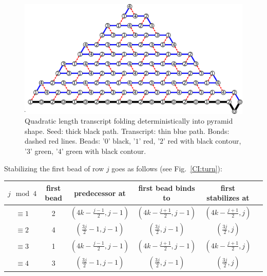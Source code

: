 \begin{figure}
	\centering
	\includegraphics[width=0.9\linewidth]{./Fig/chichenBig}
	\caption{Quadratic length transcript folding deterministically into pyramid shape. Seed: thick black path. Transcript: thin blue path. Bonds: dashed red lines. Beads: '$0$' black, '$1$' red, '$2$' red with black contour, '$3$' green, '$4$' green with black contour.}
	\label{CI:big}
\end{figure}


Stabilizing the first bead of row $j$ goes as follows (see Fig.~\ref{CI:turn}):

\begin{center}
	\begin{tabular}{|c|c|c|c|c|@{}m{0pt}@{}}
	$j\mod 4$					& first bead 	& predecessor at		& first bead binds to		& first stabilizes at\\
						\hline
	$\equiv 1$	& 2		& $(4k-\frac{j-1}{2}, j-1)$		& $(4k-\frac{j+1}{2}, j-1)$	& $(4k-\frac{j+1}{2}, j)$& $\mathrm{ }$\newline $\mathrm{ }$\\
	\hline
	$\equiv 2$	& 4				& $(\frac{3j}{2}-1,j-1)$		& $(\frac{3j}{2},j-1)$		& $(\frac{3j}{2},j)$ & $\mathrm{ }$\newline $\mathrm{ }$\\
	\hline
	$\equiv 3$	& 1				& $(4k-\frac{j-1}{2}, j-1)$		& $(4k-\frac{j+1}{2}, j-1)$	& $(4k-\frac{j+1}{2}, j)$ & $\mathrm{ }$\newline $\mathrm{ }$ \\
	\hline
	$\equiv 4$	& 3				& $(\frac{3j}{2}-1,j-1)$		& $(\frac{3j}{2},j-1)$		& $(\frac{3j}{2},j)$ & $\mathrm{ }$\newline $\mathrm{ }$ \\
	\hline		
	\end{tabular}
\end{center}



